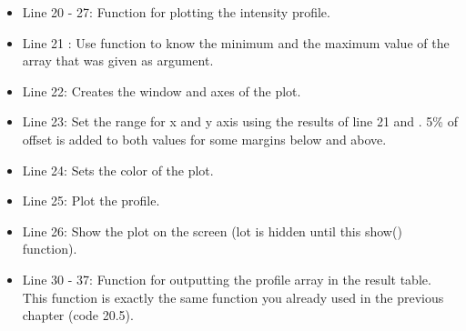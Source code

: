 \begin{itemize}
\item Line 20 - 27: Function for plotting the intensity profile.
\item Line 21 : Use  function to know the minimum and
the maximum value of the array that was given as argument.
\item Line 22: Creates the window and axes of the plot. 
\item Line 23: Set the range for x and y axis using the results of line 21
 and . 5\% of offset is added to both values for some
margins below and above.
\item Line 24: Sets the color of the plot. 
\item Line 25: Plot the profile. 
\item Line 26: Show the plot on the screen (lot is hidden until this show()
function).

\item Line 30 - 37: Function for outputting the profile array in the result
table. This function is exactly the same function you already used in the
previous chapter (code 20.5).

\end{itemize}

